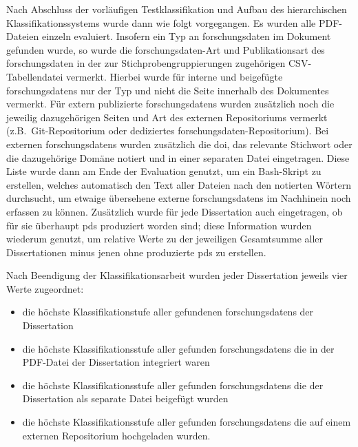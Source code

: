 Nach Abschluss der vorläufigen Testklassifikation und Aufbau des hierarchischen Klassifikationssystems wurde dann wie folgt vorgegangen.
Es wurden alle PDF-Dateien einzeln evaluiert.
Insofern ein Typ an \gls{forschungsdaten} im Dokument gefunden wurde, so wurde die \gls{forschungsdaten}-Art und Publikationsart des \gls{forschungsdaten} in der zur Stichprobengruppierungen zugehörigen CSV-Tabellendatei vermerkt.
Hierbei wurde für interne und beigefügte \glspl{forschungsdaten} nur der Typ und nicht die Seite innerhalb des Dokumentes vermerkt.
Für extern publizierte \glspl{forschungsdaten} wurden zusätzlich noch die jeweilig dazugehörigen Seiten und Art des externen Repositoriums vermerkt (z.B.~Git-Repositorium oder dediziertes \gls{forschungsdaten}-Repositorium).
Bei externen \glspl{forschungsdaten} wurden zusätzlich die \gls{doi}, das relevante Stichwort oder die dazugehörige Domäne notiert und in einer separaten Datei eingetragen.
Diese Liste wurde dann am Ende der Evaluation genutzt, um ein Bash-Skript \autocite{my-dataset} zu erstellen, welches
% 
automatisch den Text aller Dateien nach den notierten Wörtern durchsucht, um etwaige übersehene externe \glspl{forschungsdaten} im Nachhinein noch erfassen zu können.
Zusätzlich wurde für jede Dissertation auch eingetragen, ob für sie überhaupt \glspl{pd} produziert worden sind; diese Information wurden wiederum genutzt, um relative Werte zu der jeweiligen Gesamtsumme aller Dissertationen minus jenen ohne produzierte \glspl{pd} zu erstellen.
\pagebreak

Nach Beendigung der Klassifikationsarbeit wurden jeder Dissertation jeweils vier Werte zugeordnet: 
\begin{itemize}
    \item die höchste Klassifikationstufe aller gefundenen \glspl{forschungsdaten} der Dissertation
    \item die höchste Klassifikationsstufe aller gefunden \glspl{forschungsdaten} die in der PDF-Datei der Dissertation integriert waren
    \item die höchste Klassifikationsstufe aller gefunden \glspl{forschungsdaten} die der Dissertation als separate Datei beigefügt wurden
    \item die höchste Klassifikationsstufe aller gefunden \glspl{forschungsdaten} die auf einem externen Repositorium hochgeladen wurden.
\end{itemize}

